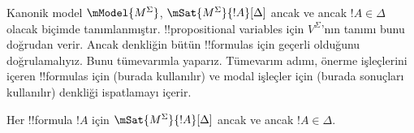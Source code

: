 



Kanonik model $\mModel{M^\Sigma}$, $\mSat{M^\Sigma}{!A}[\Delta]$ ancak ve
ancak $!A\in\Delta$ olacak biçimde tanımlanmıştır. !!{propositional
variable}s için $V^\Sigma$'nın tanımı bunu doğrudan verir. Ancak denkliğin
bütün !!{formula}s için geçerli olduğunu doğrulamalıyız. Bunu tümevarımla
yaparız. Tümevarım adımı, önerme işleçlerini içeren !!{formula}s için
(burada  kullanılır) ve modal işleçler için
(burada  sonuçları kullanılır)
denkliği ispatlamayı içerir.

\begin{prop}
  Her !!{formula} $!A$ için $\mSat{M^\Sigma}{!A}[\Delta]$ ancak ve ancak
  $!A\in\Delta$.
\end{prop}

